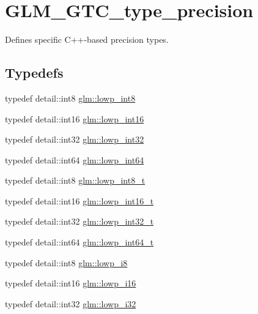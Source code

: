 \hypertarget{group__gtc__type__precision}{}\section{G\+L\+M\+\_\+\+G\+T\+C\+\_\+type\+\_\+precision}
\label{group__gtc__type__precision}


Defines specific C++-\/based precision types.  


\subsection*{Typedefs}
\begin{DoxyCompactItemize}
\item 
typedef detail\+::int8 \hyperlink{group__gtc__type__precision_gaf9e675b6392764242ae87eb179e9d3d6}{glm\+::lowp\+\_\+int8}
\item 
typedef detail\+::int16 \hyperlink{group__gtc__type__precision_ga71fc0c399fa4780507748b643733f153}{glm\+::lowp\+\_\+int16}
\item 
typedef detail\+::int32 \hyperlink{group__gtc__type__precision_gad9939c9d6fec1c6accc02a83c6500f08}{glm\+::lowp\+\_\+int32}
\item 
typedef detail\+::int64 \hyperlink{group__gtc__type__precision_gab8a8e75af347592406e41b3ae2c0712b}{glm\+::lowp\+\_\+int64}
\item 
typedef detail\+::int8 \hyperlink{group__gtc__type__precision_gae6092311f6970a305c2df19a372360a3}{glm\+::lowp\+\_\+int8\+\_\+t}
\item 
typedef detail\+::int16 \hyperlink{group__gtc__type__precision_gae34c3d53c4c1434fc9f26538b0185667}{glm\+::lowp\+\_\+int16\+\_\+t}
\item 
typedef detail\+::int32 \hyperlink{group__gtc__type__precision_gad9567c806dc39f534174eef42663119d}{glm\+::lowp\+\_\+int32\+\_\+t}
\item 
typedef detail\+::int64 \hyperlink{group__gtc__type__precision_ga14d72e76d57c7f28eca8e933816c9fd6}{glm\+::lowp\+\_\+int64\+\_\+t}
\item 
typedef detail\+::int8 \hyperlink{group__gtc__type__precision_gaa2e13ee29c90f75658beed6082541097}{glm\+::lowp\+\_\+i8}
\item 
typedef detail\+::int16 \hyperlink{group__gtc__type__precision_gaf7bbfd31bcec25a416ea94d09efb5451}{glm\+::lowp\+\_\+i16}
\item 
typedef detail\+::int32 \hyperlink{group__gtc__type__precision_ga70fd34e8b8cffc92739161284ed77328}{glm\+::lowp\+\_\+i32}

\end{DoxyCompactItemize}
